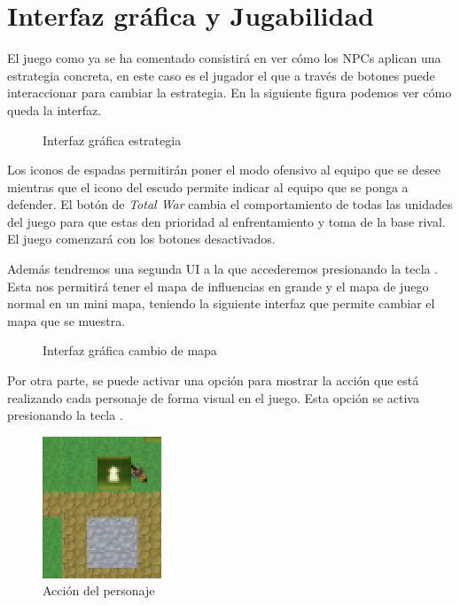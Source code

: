 \section{Interfaz gráfica y Jugabilidad} \label{sec:interfaz}

El juego como ya se ha comentado consistirá en ver cómo los NPCs aplican una estrategia concreta, en este caso es el jugador el que a través de botones puede interaccionar para cambiar la estrategia. En la siguiente figura podemos ver cómo queda la interfaz.

\begin{figure}[H]
    \centering
    
    \caption{Interfaz gráfica estrategia}
    \label{fig:mainButtons}
\end{figure}

Los iconos de espadas permitirán poner el modo ofensivo al equipo que se desee mientras que el icono del escudo permite indicar al equipo que se ponga a defender. El botón de \textit{Total War} cambia el comportamiento de todas las unidades del juego para que estas den prioridad al enfrentamiento y toma de la base rival. El juego comenzará con los botones desactivados.

Además tendremos una segunda UI a la que accederemos presionando la tecla . Esta nos permitirá tener el mapa de influencias en grande y el mapa de juego normal en un mini mapa, teniendo la siguiente interfaz que permite cambiar el mapa que se muestra.

\begin{figure}[H]
    \centering
    \caption{Interfaz gráfica cambio de mapa}
    \label{fig:mainButtons}
\end{figure}

Por otra parte, se puede activar una opción para mostrar la acción que está realizando cada personaje de forma visual en el juego. Esta opción se activa presionando la tecla .

\begin{figure}[H]
    \centering
    \includegraphics{images/actionState.png}
    \caption{Acción del personaje}
    \label{fig:actionState}
\end{figure}

